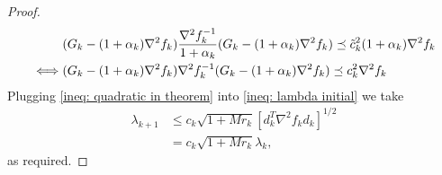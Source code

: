 \documentclass[10pt,a4paper]{amsart}
\begin{document}
\begin{proof}
\begin{align}
        & (G_k - (1 + \alpha_k)\nabla^2 f_{k})  \frac{\nabla^2 f_k^{-1}}{1+\alpha_k} (G_k - (1 + \alpha_k)\nabla^2 f_{k}) \preceq \tilde{c}_k^2 (1 + \alpha_k)\nabla^2 f_k \notag \\
        \iff & (G_k - (1 + \alpha_k)\nabla^2 f_{k})  \nabla^2 f_k^{-1} (G_k - (1 + \alpha_k)\nabla^2 f_{k}) \preceq c_k^2 \nabla^2 f_k
    \end{align}
    Plugging \eqref{ineq: quadratic in theorem} into \eqref{ineq: lambda initial} we take
    \begin{align*}
        \lambda_{k+1} & \leq c_k \sqrt{1 + M r_k} \left[d_k^T \nabla^2 f_k d_k \right]^{1/2} \\
        & = c_k \sqrt{1 + M r_k} \lambda_k,
    \end{align*}
    as required.
\end{proof}
\end{document}
